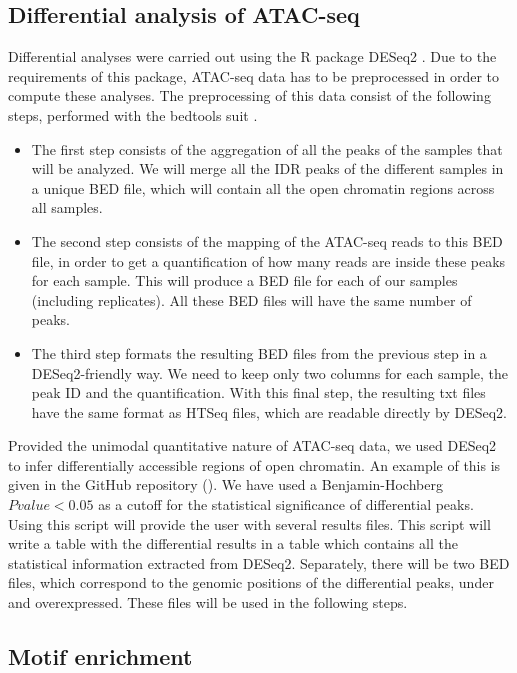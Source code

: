 \subsection{Differential analysis of ATAC-seq}

Differential analyses were carried out using the R package DESeq2 \parencite{love_moderated_2014}. Due to the requirements of this package, ATAC-seq data has to be preprocessed in order to compute these analyses. The preprocessing of this data consist of the following steps, performed with the bedtools suit \parencite{quinlan_bedtools_2010}. 
\begin{itemize}
    \item The first step consists of the aggregation of all the peaks of the samples that will be analyzed. We will merge all the IDR peaks of the different samples in a unique BED file, which will contain all the open chromatin regions across all samples. 
    \item The second step consists of the mapping of the ATAC-seq reads to this BED file, in order to get a quantification of how many reads are inside these peaks for each sample. This will produce a BED file for each of our samples (including replicates). All these BED files will have the same number of peaks.
    \item The third step formats the resulting BED files from the previous step in a DESeq2-friendly way. We need to keep only two columns for each sample, the peak ID and the quantification. With this final step, the resulting txt files have the same format as HTSeq files, which are readable directly by DESeq2.
\end{itemize}

Provided the unimodal quantitative nature of ATAC-seq data, we used DESeq2 to infer differentially accessible regions of open chromatin. An example of this is given in the GitHub repository (). We have used a Benjamin-Hochberg $P value < 0.05 $ as a cutoff for the statistical significance of differential peaks. Using this script will provide the user with several results files. This script will write a table with the differential results in a table which contains all the statistical information extracted from DESeq2. Separately, there will be two BED files, which correspond to the genomic positions of the differential peaks, under and overexpressed. These files will be used in the following steps.

\subsection{Motif enrichment}
\label{meth:motif_enrichment}

